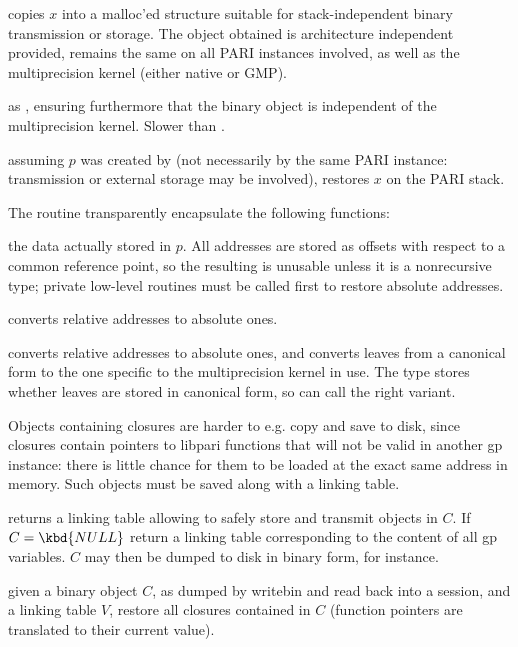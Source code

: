 
 copies $x$ into a malloc'ed structure suitable
for stack-independent binary transmission or storage. The object obtained
is architecture independent provided,  remains the same
on all PARI instances involved, as well as the multiprecision kernel (either
native or GMP).

 as , ensuring furthermore
that the binary object is independent of the multiprecision kernel. Slower
than .

 assuming $p$ was created by 
(not necessarily by the same PARI instance: transmission or external storage
may be involved), restores $x$ on the PARI stack.

\noindent The routine  transparently encapsulate the following
functions:

 the  data actually stored in $p$.
All addresses are stored as offsets with respect to a common reference point,
so the resulting  is unusable unless it is a nonrecursive type;
private low-level routines must be called first to restore absolute addresses.

 converts relative addresses to
absolute ones.

 converts relative addresses to
absolute ones, and converts leaves from a canonical form to the one
specific to the multiprecision kernel in use. The  type stores
whether leaves are stored in canonical form, so  can call
the right variant.

\noindent Objects containing closures are harder to e.g. copy and save to disk,
since closures contain pointers to libpari functions that will not be valid in
another gp instance: there is little chance for them to be loaded at the exact
same address in memory. Such objects must be saved along with a linking table.

 returns a linking table allowing to safely
store and transmit  objects in $C$.  If $C = \kbd{NULL}$ return a
linking table corresponding to the content of all gp variables. $C$ may then be
dumped to disk in binary form, for instance.

 given a binary object $C$, as dumped
by writebin and read back into a session, and a linking table $V$, restore all
closures contained in $C$ (function pointers are translated to their current
value).

